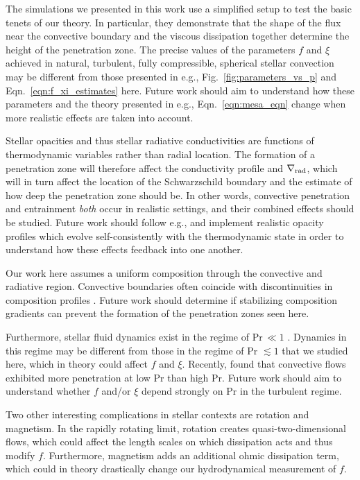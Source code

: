 \documentclass[twocolumn]{aastex631}
\newcommand{\gradrad}{\ensuremath{\nabla_{\rm{rad}}}}
\newcommand\Pran{\ensuremath{\mathrm{Pr}}}
\begin{document}
The simulations we presented in this work use a simplified setup to test the basic tenets of our theory.
In particular, they demonstrate that the shape of the flux near the convective boundary and the viscous dissipation together determine the height of the penetration zone.
The precise values of the parameters $f$ and $\xi$ achieved in natural, turbulent, fully compressible, spherical stellar convection may be different from those presented in e.g., Fig.~\ref{fig:parameters_vs_p} and Eqn.~\ref{eqn:f_xi_estimates} here.
Future work should aim to understand how these parameters and the theory presented in e.g., Eqn.~\ref{eqn:mesa_eqn} change when more realistic effects are taken into account.

Stellar opacities and thus stellar radiative conductivities are functions of thermodynamic variables rather than radial location.
The formation of a penetration zone will therefore affect the conductivity profile and $\gradrad$, which will in turn affect the location of the Schwarzschild boundary and the estimate of how deep the penetration zone should be.
In other words, convective penetration and entrainment \emph{both} occur in realistic settings, and their combined effects should be studied.
Future work should follow e.g., \citet{kapyla_etal_2017} and implement realistic opacity profiles which evolve self-consistently with the thermodynamic state in order to understand how these effects feedback into one another.

Our work here assumes a uniform composition through the convective and radiative region.
Convective boundaries often coincide with discontinuities in composition profiles \citep{salaris_cassisi_2017}.
Future work should determine if stabilizing composition gradients can prevent the formation of the penetration zones seen here.

Furthermore, stellar fluid dynamics exist in the regime of Pr$\,\ll1$ \citep{garaud2021}.
Dynamics in this regime may be different from those in the regime of Pr $\lesssim 1$ that we studied here, which in theory could affect $f$ and $\xi$.
Recently, \citet{kapyla2021} found that convective flows exhibited more penetration at low Pr than high Pr.
Future work should aim to understand whether $f$ and/or $\xi$ depend strongly on $\Pran$ in the turbulent regime.

Two other interesting complications in stellar contexts are rotation and magnetism.
In the rapidly rotating limit, rotation creates quasi-two-dimensional flows, which could affect the length scales on which dissipation acts and thus modify $f$.
Furthermore, magnetism adds an additional ohmic dissipation term, which could in theory drastically change our hydrodynamical measurement of $f$.
\end{document}
